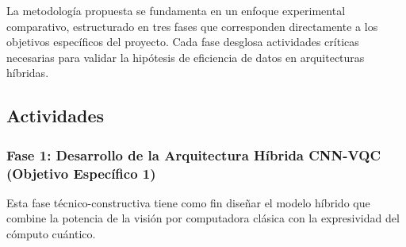 \documentclass[12pt,letterpaper]{article}
\begin{document}
    La metodología propuesta se fundamenta en un enfoque experimental comparativo, estructurado en tres fases que corresponden directamente a los objetivos específicos del proyecto. Cada fase desglosa actividades críticas necesarias para validar la hipótesis de eficiencia de datos en arquitecturas híbridas.
    
    \subsection{Actividades}
    \vspace{-0.5cm}
    
    \subsubsection{Fase 1: Desarrollo de la Arquitectura Híbrida CNN-VQC (Objetivo Específico 1)}
    Esta fase técnico-constructiva tiene como fin diseñar el modelo híbrido que combine la potencia de la visión por computadora clásica con la expresividad del cómputo cuántico.
    
\end{document}
